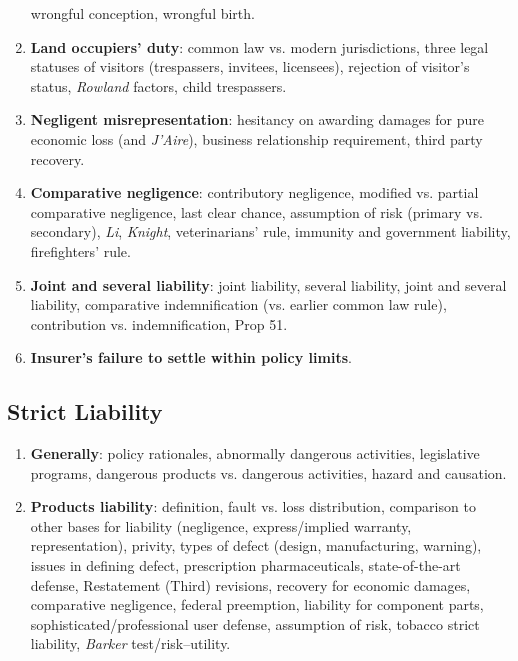 \begin{enumerate}
    wrongful conception, wrongful birth.
    \item \textbf{Land occupiers' duty}: common law vs. modern jurisdictions, 
    three legal statuses of visitors (trespassers, invitees, licensees), 
    rejection of visitor's status, \emph{Rowland} factors, child trespassers.
    \item \textbf{Negligent misrepresentation}: hesitancy on awarding damages 
    for pure economic loss (and \emph{J'Aire}), business relationship 
    requirement, third party recovery.
    \item \textbf{Comparative negligence}: contributory negligence, modified 
    vs. partial comparative negligence, last clear chance, assumption of risk 
    (primary vs. secondary), \emph{Li}, \emph{Knight}, veterinarians' rule, 
    immunity and government liability, firefighters' rule.
    \item \textbf{Joint and several liability}: joint liability, several 
    liability, joint and several liability, comparative indemnification (vs. 
    earlier common law rule), contribution vs. indemnification, Prop 51.
    \item \textbf{Insurer's failure to settle within policy limits}.
\end{enumerate}

\subsection{Strict Liability}

\begin{enumerate}
    \item \textbf{Generally}: policy rationales, abnormally dangerous activities, 
    legislative programs, dangerous products vs. dangerous activities, hazard 
    and causation.
    \item \textbf{Products liability}: definition, fault vs. loss 
    distribution, comparison to other bases for liability (negligence, 
    express/implied warranty, representation), privity, types of defect 
    (design, manufacturing, warning), issues in defining defect, prescription 
    pharmaceuticals, state-of-the-art defense, Restatement (Third) revisions, 
    recovery for economic damages, comparative negligence, federal preemption, 
    liability for component parts, sophisticated/professional user defense, 
    assumption of risk, tobacco strict liability, \emph{Barker} 
    test/risk--utility.
\end{enumerate}

